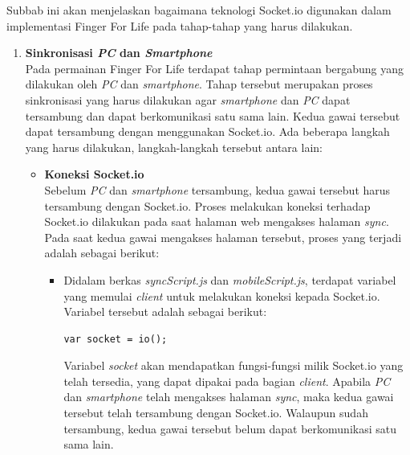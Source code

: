 Subbab ini akan menjelaskan bagaimana teknologi Socket.io digunakan dalam implementasi Finger For Life pada tahap-tahap yang harus dilakukan.
\begin{enumerate}
	\item \textbf{Sinkronisasi \textit{PC} dan \textit{Smartphone}} \\
	Pada permainan Finger For Life terdapat tahap permintaan bergabung yang dilakukan oleh \textit{PC} dan \textit{smartphone}. Tahap tersebut merupakan proses sinkronisasi yang harus dilakukan agar \textit{smartphone} dan \textit{PC} dapat tersambung dan dapat berkomunikasi satu sama lain. Kedua gawai tersebut dapat tersambung dengan menggunakan Socket.io. Ada beberapa langkah yang harus dilakukan, langkah-langkah tersebut antara lain:
	\begin{itemize}
		\item \textbf{Koneksi Socket.io} \\
		Sebelum \textit{PC} dan \textit{smartphone} tersambung, kedua gawai tersebut harus tersambung dengan Socket.io. Proses melakukan koneksi terhadap Socket.io dilakukan pada saat halaman web mengakses halaman \textit{sync}. Pada saat kedua gawai mengakses halaman tersebut, proses yang terjadi adalah sebagai berikut:
		\begin{itemize}
			\item Didalam berkas \textit{syncScript.js} dan \textit{mobileScript.js}, terdapat variabel yang memulai \textit{client} untuk melakukan koneksi kepada Socket.io. Variabel tersebut adalah sebagai berikut:
\begin{lstlisting}
var socket = io();
\end{lstlisting}
			Variabel \textit{socket} akan mendapatkan fungsi-fungsi milik Socket.io yang telah tersedia, yang dapat dipakai pada bagian \textit{client}. Apabila \textit{PC} dan \textit{smartphone} telah mengakses halaman \textit{sync}, maka kedua gawai tersebut telah tersambung dengan Socket.io. Walaupun sudah tersambung, kedua gawai tersebut belum dapat berkomunikasi satu sama lain.
		\end{itemize}
	

\end{itemize}
\end{enumerate}
